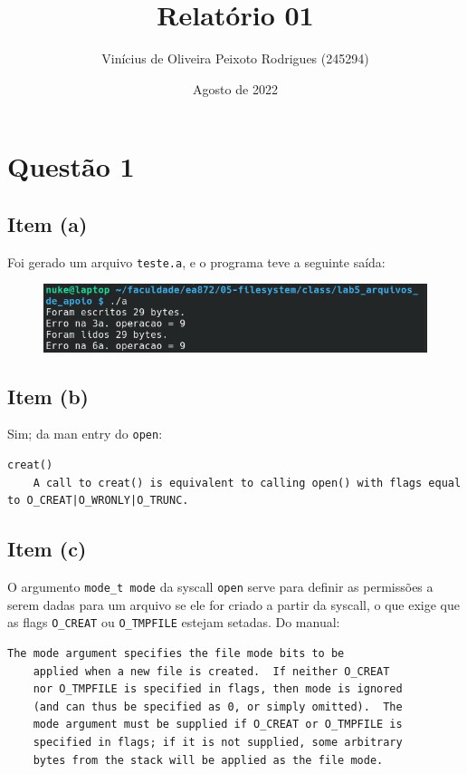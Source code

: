 \documentclass{article}
\title{Relatório 01}
\author{Vinícius de Oliveira Peixoto Rodrigues (245294)}
\date{Agosto de 2022}
\begin{document}
\maketitle

\section*{Questão 1}

\subsection*{Item (a)}

Foi gerado um arquivo \texttt{teste.a}, e o programa teve a seguinte saída:

\begin{figure}[!ht]
    \begin{center}
        \includegraphics[width=\textwidth]{images/item_a.png}
    \end{center}
\end{figure} 

\subsection*{Item (b)}

Sim; da man entry do \texttt{open}:

\begin{lstlisting}[breaklines]
    creat()
    A call to creat() is equivalent to calling open() with flags equal to O_CREAT|O_WRONLY|O_TRUNC.
\end{lstlisting}

\subsection*{Item (c)}

O argumento \texttt{mode\_t mode} da syscall \texttt{open} serve para definir as permissões a serem dadas para um arquivo se ele for criado a partir da syscall, o que exige que as flags \texttt{O\_CREAT} ou \texttt{O\_TMPFILE} estejam setadas. Do manual:

\begin{lstlisting}[breaklines]
    The mode argument specifies the file mode bits to be
    applied when a new file is created.  If neither O_CREAT
    nor O_TMPFILE is specified in flags, then mode is ignored
    (and can thus be specified as 0, or simply omitted).  The
    mode argument must be supplied if O_CREAT or O_TMPFILE is
    specified in flags; if it is not supplied, some arbitrary
    bytes from the stack will be applied as the file mode. 
\end{lstlisting}
\end{document}
